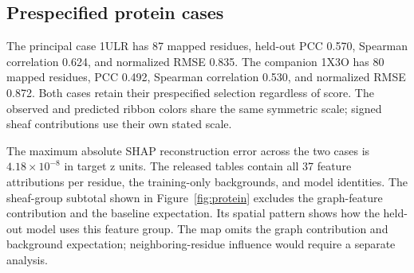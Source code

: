 \subsection{Prespecified protein cases}
The principal case 1ULR has 87 mapped residues, held-out PCC 0.570, Spearman correlation 0.624, and normalized RMSE 0.835. The companion 1X3O has 80 mapped residues, PCC 0.492, Spearman correlation 0.530, and normalized RMSE 0.872. Both cases retain their prespecified selection regardless of score. The observed and predicted ribbon colors share the same symmetric scale; signed sheaf contributions use their own stated scale.

The maximum absolute SHAP reconstruction error across the two cases is $4.18\times10^{-8}$ in target z units. The released tables contain all 37 feature attributions per residue, the training-only backgrounds, and model identities. The sheaf-group subtotal shown in Figure~\ref{fig:protein} excludes the graph-feature contribution and the baseline expectation. Its spatial pattern shows how the held-out model uses this feature group. The map omits the graph contribution and background expectation; neighboring-residue influence would require a separate analysis.

